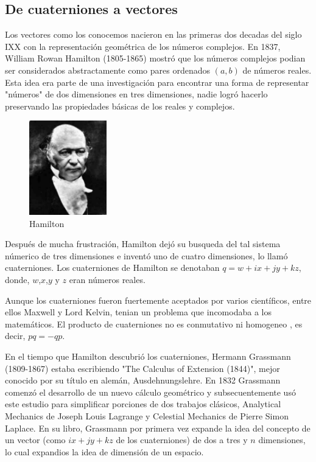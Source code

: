 \subsection{De cuaterniones a vectores}
Los vectores como los conocemos nacieron en las primeras dos decadas del siglo IXX con la representación
geométrica de los números complejos. En 1837, William Rowan Hamilton (1805-1865) mostró que los números
complejos podian ser considerados abstractamente como pares ordenados $(a,b)$ de números reales. Esta idea
era parte de una investigación para encontrar una forma de representar "números" de dos dimensiones en tres
dimensiones, nadie logró hacerlo preservando las propiedades básicas de los reales y complejos. \\

\begin{figure}
  \begin{center}
    \includegraphics[width=0.3\textwidth]{gfx/hamilton}
  \end{center}
  \caption{Hamilton}
\end{figure}

Después de mucha frustración, Hamilton dejó su busqueda del tal sistema númerico de tres dimensiones e inventó
uno de cuatro dimensiones, lo llamó cuaterniones. Los cuaterniones de Hamilton se denotaban $q = w + ix + jy + kz$, donde, $w$,$x$,$y$ y $z$ eran números reales.

Aunque los cuaterniones fueron fuertemente aceptados por varios científicos, entre ellos Maxwell y Lord Kelvin,
tenian un problema que incomodaba a los matemáticos. El producto de cuaterniones no es conmutativo ni homogeneo
, es decir, $pq = -qp$.

En el tiempo que Hamilton descubrió los cuaterniones, Hermann Grassmann (1809-1867) estaba escribiendo
"The Calculus of Extension (1844)", mejor conocido por su título en alemán, Ausdehnungslehre. En 1832
Grassmann comenzó el desarrollo de un nuevo cálculo geométrico y subsecuentemente usó este estudio para
simplificar porciones de dos trabajos clásicos, Analytical Mechanics de Joseph Louis Lagrange y Celestial
Mechanics de Pierre Simon Laplace. En su libro, Grassmann por primera vez expande la idea del concepto
de un vector (como $ix + jy + kz$ de los cuaterniones) de dos a tres y $n$ dimensiones, lo cual expandios
la idea de dimensión de un espacio.

